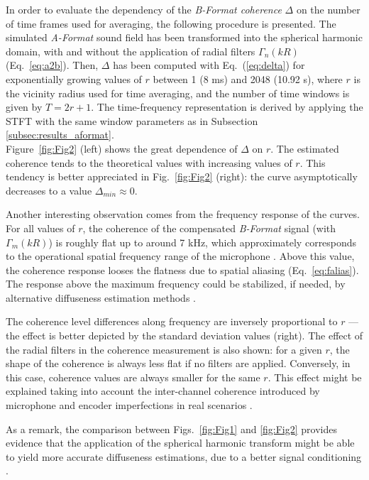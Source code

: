 In order to evaluate the dependency of the \textit{B-Format coherence} $\Delta$ on the number of time frames used for averaging, the following procedure is presented.
The simulated \textit{A-Format} sound field has been transformed into the spherical harmonic domain, with and without the application of radial filters $\Gamma_n(kR)$ (Eq.~\ref{eq:a2b}). Then, $\Delta$ has been computed with Eq.~(\ref{eq:delta}) for exponentially growing values of $r$ between 1 (8 ms) and 2048 (10.92 s), where $r$ is the vicinity radius used for time averaging, and the number of time windows is given by $T = 2r+1$.
The time-frequency representation is derived by applying the STFT with the same window parameters as in Subsection \ref{subsec:results_aformat}.\\

Figure~\ref{fig:Fig2} (left) shows the great dependence of $\Delta$ on $r$.  The estimated coherence tends to the theoretical values with increasing values of $r$. This tendency is better appreciated in Fig.~\ref{fig:Fig2} (right): the curve asymptotically decreases to a value $\Delta_{min}\approx0$.

Another interesting observation comes from the frequency response of the curves. For all values of $r$, the coherence of the compensated \textit{B-Format} signal (with $\Gamma_m(kR)$) is roughly flat up to around 7 kHz, which approximately corresponds to the operational spatial frequency range of the microphone \cite{gerzon1975design}.
Above this value, the coherence response looses the flatness due to spatial aliasing (Eq.~\ref{eq:falias}). The response above the maximum frequency could be stabilized, if needed, by alternative diffuseness estimation methods \cite{politis_direction--arrival_2015}.

The coherence level differences along frequency are inversely proportional to $r$ --- the effect is better depicted by the standard deviation values (right).
The effect of the radial filters in the coherence measurement is also shown: for a given $r$, the shape of the coherence is always less flat if no filters are applied. Conversely, in this case, coherence values are always smaller for the same $r$. This effect might be explained taking into account the inter-channel coherence introduced by microphone and encoder imperfections in real scenarios \cite{schorkhuber_ambisonic_2017}.

As a remark, the comparison between Figs.~\ref{fig:Fig1} and \ref{fig:Fig2} provides evidence that the application of the spherical harmonic transform might be able to yield more accurate diffuseness estimations, due to a better signal conditioning \cite{epain_spherical_2016}.\\



